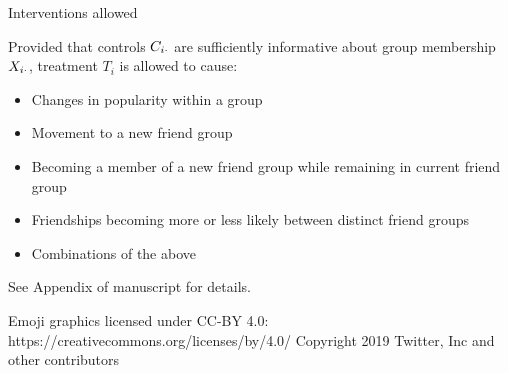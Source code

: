 \documentclass{beamer}
\theoremstyle{remark}
\begin{document}




\begin{frame}{Interventions allowed}

    Provided that controls $C_{i \cdot}$ are sufficiently informative about group membership $X_{i \cdot}$, treatment $T_i$ is allowed to cause:

    \begin{itemize}
        \item Changes in popularity within a group
        \item Movement to a new friend group
        \item Becoming a member of a new friend group while remaining in current friend group
        \item Friendships becoming more or less likely between distinct friend groups
        \item Combinations of the above
    \end{itemize}

    See Appendix of manuscript for details.

\end{frame}

\begin{frame}
    Emoji graphics licensed under CC-BY 4.0: https://creativecommons.org/licenses/by/4.0/
    Copyright 2019 Twitter, Inc and other contributors
\end{frame}



\end{document}
